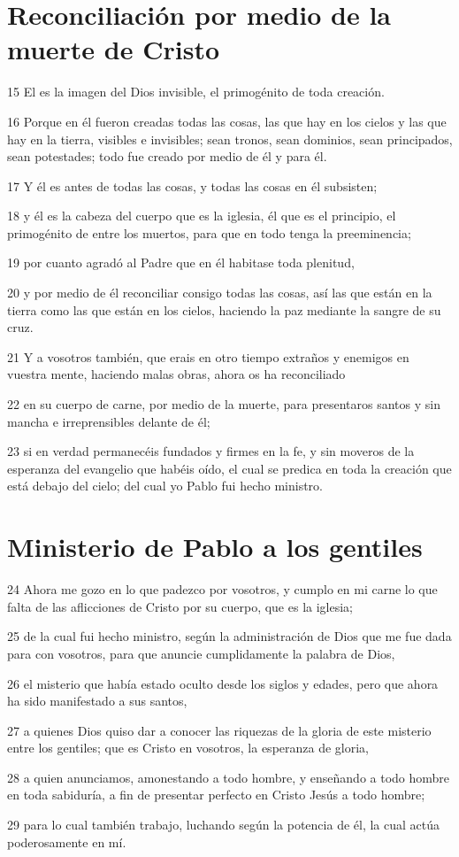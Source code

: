 \section*{Reconciliación por medio de la muerte de Cristo}

\par 15 El es la imagen del Dios invisible, el primogénito de toda creación.
\par 16 Porque en él fueron creadas todas las cosas, las que hay en los cielos y las que hay en la tierra, visibles e invisibles; sean tronos, sean dominios, sean principados, sean potestades; todo fue creado por medio de él y para él.
\par 17 Y él es antes de todas las cosas, y todas las cosas en él subsisten;
\par 18 y él es la cabeza del cuerpo que es la iglesia, él que es el principio, el primogénito de entre los muertos, para que en todo tenga la preeminencia;
\par 19 por cuanto agradó al Padre que en él habitase toda plenitud,
\par 20 y por medio de él reconciliar consigo todas las cosas, así las que están en la tierra como las que están en los cielos, haciendo la paz mediante la sangre de su cruz.
\par 21 Y a vosotros también, que erais en otro tiempo extraños y enemigos en vuestra mente, haciendo malas obras, ahora os ha reconciliado
\par 22 en su cuerpo de carne, por medio de la muerte, para presentaros santos y sin mancha e irreprensibles delante de él;
\par 23 si en verdad permanecéis fundados y firmes en la fe, y sin moveros de la esperanza del evangelio que habéis oído, el cual se predica en toda la creación que está debajo del cielo; del cual yo Pablo fui hecho ministro.

\section*{Ministerio de Pablo a los gentiles}

\par 24 Ahora me gozo en lo que padezco por vosotros, y cumplo en mi carne lo que falta de las aflicciones de Cristo por su cuerpo, que es la iglesia;
\par 25 de la cual fui hecho ministro, según la administración de Dios que me fue dada para con vosotros, para que anuncie cumplidamente la palabra de Dios,
\par 26 el misterio que había estado oculto desde los siglos y edades, pero que ahora ha sido manifestado a sus santos,
\par 27 a quienes Dios quiso dar a conocer las riquezas de la gloria de este misterio entre los gentiles; que es Cristo en vosotros, la esperanza de gloria,
\par 28 a quien anunciamos, amonestando a todo hombre, y enseñando a todo hombre en toda sabiduría, a fin de presentar perfecto en Cristo Jesús a todo hombre;
\par 29 para lo cual también trabajo, luchando según la potencia de él, la cual actúa poderosamente en mí.

